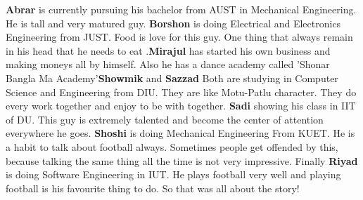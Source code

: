 \documentclass[11pt, a4paper]{article}
\begin{document}
\textbf{Abrar} is currently pursuing his bachelor from AUST in Mechanical Engineering. He is tall and very matured guy. \textbf{Borshon} is doing Electrical and Electronics Engineering from JUST. Food is love for this guy. One thing that always remain in his head that he needs to eat .\textbf{Mirajul} has started his own business and making moneys all by himself. Also he has a dance academy called 'Shonar Bangla Ma Academy'\textbf{Showmik} and \textbf{Sazzad} Both are studying in Computer Science and Engineering from DIU. They are like Motu-Patlu character. They do every work together and enjoy to be with together. \textbf{Sadi} showing his class in IIT of DU. This guy is extremely talented and become the center of attention everywhere he goes. \textbf{Shoshi} is doing Mechanical Engineering From KUET. He is a habit to talk about football always. Sometimes people get offended by this, because talking the same thing all the time is not very impressive. Finally \textbf{Riyad} is doing Software Engineering in IUT. He plays football very well and playing football is his favourite thing to do. So that was all about the story!
\end{document}
